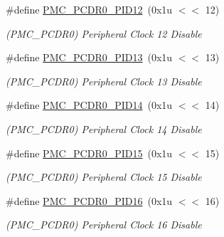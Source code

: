 \begin{DoxyCompactItemize}
\mbox{\label{group__SAME70__PMC_gad2fcc7f49522909d0106d76a63d1b12f}} 
\#define \mbox{\hyperlink{group__SAME70__PMC_gad2fcc7f49522909d0106d76a63d1b12f}{P\+M\+C\+\_\+\+P\+C\+D\+R0\+\_\+\+P\+I\+D12}}~(0x1u $<$$<$ 12)
\begin{DoxyCompactList}\small\item\em (P\+M\+C\+\_\+\+P\+C\+D\+R0) Peripheral Clock 12 Disable \end{DoxyCompactList}\item 
\mbox{\label{group__SAME70__PMC_gac04c996cfaec7ab9e5518f4780882300}} 
\#define \mbox{\hyperlink{group__SAME70__PMC_gac04c996cfaec7ab9e5518f4780882300}{P\+M\+C\+\_\+\+P\+C\+D\+R0\+\_\+\+P\+I\+D13}}~(0x1u $<$$<$ 13)
\begin{DoxyCompactList}\small\item\em (P\+M\+C\+\_\+\+P\+C\+D\+R0) Peripheral Clock 13 Disable \end{DoxyCompactList}\item 
\mbox{\label{group__SAME70__PMC_ga30a0e016edb59302453ffd1fb0ce1960}} 
\#define \mbox{\hyperlink{group__SAME70__PMC_ga30a0e016edb59302453ffd1fb0ce1960}{P\+M\+C\+\_\+\+P\+C\+D\+R0\+\_\+\+P\+I\+D14}}~(0x1u $<$$<$ 14)
\begin{DoxyCompactList}\small\item\em (P\+M\+C\+\_\+\+P\+C\+D\+R0) Peripheral Clock 14 Disable \end{DoxyCompactList}\item 
\mbox{\label{group__SAME70__PMC_gae7739b10f4ea282433695fdcdcfefd2f}} 
\#define \mbox{\hyperlink{group__SAME70__PMC_gae7739b10f4ea282433695fdcdcfefd2f}{P\+M\+C\+\_\+\+P\+C\+D\+R0\+\_\+\+P\+I\+D15}}~(0x1u $<$$<$ 15)
\begin{DoxyCompactList}\small\item\em (P\+M\+C\+\_\+\+P\+C\+D\+R0) Peripheral Clock 15 Disable \end{DoxyCompactList}\item 
\mbox{\label{group__SAME70__PMC_ga1eed6205a0bc82ecfe67ebd13b87aef6}} 
\#define \mbox{\hyperlink{group__SAME70__PMC_ga1eed6205a0bc82ecfe67ebd13b87aef6}{P\+M\+C\+\_\+\+P\+C\+D\+R0\+\_\+\+P\+I\+D16}}~(0x1u $<$$<$ 16)
\begin{DoxyCompactList}\small\item\em (P\+M\+C\+\_\+\+P\+C\+D\+R0) Peripheral Clock 16 Disable \end{DoxyCompactList}\item 
$$
\end{DoxyCompactItemize}

